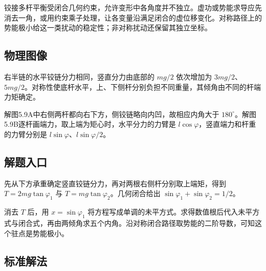 \documentclass[UTF8,fontset=fandol,a4paper,11pt]{ctexart}
\begin{document}
铰接多杆平衡受闭合几何约束，允许变形中各角度并不独立。虚功或势能求导应先消去一角，或用约束乘子处理，让各变量沿满足闭合的虚位移变化。对称路径上的势能极小给这一类扰动的稳定性；非对称扰动还保留其独立坐标。




\subsection*{物理图像}

右半链的水平铰链分力相同，竖直分力由底部的 $mg/2$ 依次增加为 $3mg/2$、$5mg/2$。对称性使底杆水平，上、下侧杆分别负担不同重量，其倾角由不同的杆端力矩确定。

解图5.9A中右侧两杆都向右下方，侧铰链略向内凹，故相应内角大于 $180^\circ$。解图5.9B逐杆画端力，取上端为矩心时，水平分力的力臂是 $l\cos\varphi$，竖直端力和杆重的力臂分别是 $l\sin\varphi$、$l\sin\varphi/2$。



\subsection*{解题入口}

先从下方承重确定竖直铰链分力，再对两根右侧杆分别取上端矩，得到 $T=2mg\tan\varphi_1$ 与 $T=mg\tan\varphi_2$。几何闭合给出 $\sin\varphi_1+\sin\varphi_2=1/2$。

消去 $T$ 后，用 $x=\sin\varphi_1$ 将方程写成单调的未平方式。求得数值根后代入未平方式与闭合式，再由两倾角求五个内角。沿对称闭合路径取势能的二阶导数，可知这个驻点是势能极小。



\subsection*{标准解法}
\end{document}
